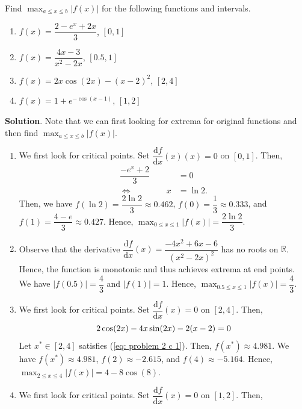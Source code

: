 \documentclass[11pt]{article}
\theoremstyle{break}
\newcommand{\dd}{\text{d}}
\numberwithin{equation}{theorem}
\begin{document}
\newpage
\begin{problem}\label{problem 2}
    Find $\displaystyle\max_{a\leq x\leq b}|f(x)|$ for the following functions and intervals.
    \begin{enumerate}
        \item $f(x)=\dfrac{2-e^x+2x}{3}$, $[0, 1]$
        \item $f(x)=\dfrac{4x-3}{x^2-2x}$, $[0.5, 1]$
        \item $f(x)=2x\cos(2x)-(x-2)^2$, $[2, 4]$
        \item $f(x)=1+e^{-\cos(x-1)}$, $[1, 2]$
    \end{enumerate}
\end{problem}
\textbf{Solution}. Note that we can first looking for extrema for original functions and then find $\displaystyle\max_{a\leq x\leq b}|f(x)|$.
\begin{enumerate}
    \item We first look for critical points. Set $\dfrac{\dd f}{\dd x}(x)(x)=0$ on $[0, 1]$. Then, \vspace{-0.6em}
    \begin{align*}
        \dfrac{-e^x+2}{3}&=0\\
        \iff \quad\quad\quad\quad x&=\ln2.
    \end{align*}
    Then, we have $f(\ln 2)=\dfrac{2\ln 2}{3}\approx0.462$, $f(0)=\dfrac{1}{3}\approx0.333$, and $f(1)=\dfrac{4-e}{3}\approx0.427$. Hence, $\displaystyle\max_{0\leq x\leq 1}|f(x)|=\dfrac{2\ln 2}{3}$.
    \item Observe that the derivative $\dfrac{\dd f}{\dd x}(x)=\dfrac{-4x^2+6x-6}{(x^2-2x)^2}$ has no roots on $\mathbb R$. Hence, the function is monotonic and thus achieves extrema at end points. We have $|f(0.5)|=\dfrac{4}{3}$ and $|f(1)|=1$. Hence, $\displaystyle\max_{0.5\leq x\leq 1}|f(x)|=\dfrac{4}{3}$.
    \item We first look for critical points. Set $\dfrac{\dd f}{\dd x}(x)=0$ on $[2, 4]$. Then, \vspace{-0.6em}
    \begin{equation}\label{eq: problem 2 c 1}
        2\cos(2x)-4x\sin(2x)-2(x-2)=0 \vspace{-0.6em}
    \end{equation}
    Let $x^\ast\in[2, 4]$ satisfies (\ref{eq: problem 2 c 1}). Then, $f(x^\ast)\approx4.981$. We have $f(x^\ast)\approx4.981$, $f(2)\approx-2.615$, and $f(4)\approx-5.164$. Hence, $\displaystyle\max_{2\leq x\leq 4}|f(x)|=4-8\cos(8)$.
    \item We first look for critical points. Set $\dfrac{\dd f}{\dd x}(x)=0$ on $[1, 2]$. Then, \vspace{-0.6em}

\end{enumerate}
\end{document}
